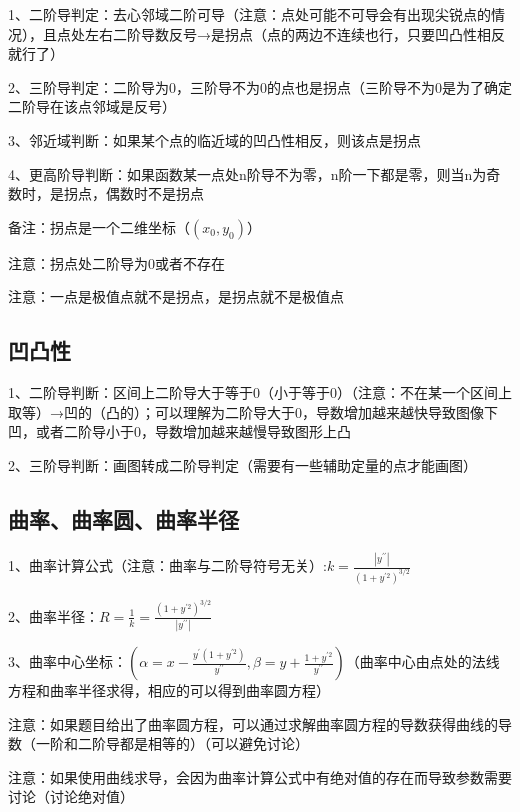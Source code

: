 1、二阶导判定：去心邻域二阶可导（注意：点处可能不可导会有出现尖锐点的情况），且点处左右二阶导数反号→是拐点（点的两边不连续也行，只要凹凸性相反就行了）

2、三阶导判定：二阶导为0，三阶导不为0的点也是拐点（三阶导不为0是为了确定二阶导在该点邻域是反号）

3、邻近域判断：如果某个点的临近域的凹凸性相反，则该点是拐点

4、更高阶导判断：如果函数某一点处n阶导不为零，n阶一下都是零，则当n为奇数时，是拐点，偶数时不是拐点

备注：拐点是一个二维坐标（$(x_0,y_0)$）

注意：拐点处二阶导为0或者不存在

注意：一点是极值点就不是拐点，是拐点就不是极值点



\subsection{凹凸性}

1、二阶导判断：区间上二阶导大于等于0（小于等于0）（注意：不在某一个区间上取等）→凹的（凸的）；可以理解为二阶导大于0，导数增加越来越快导致图像下凹，或者二阶导小于0，导数增加越来越慢导致图形上凸

2、三阶导判断：画图转成二阶导判定（需要有一些辅助定量的点才能画图）



\subsection{曲率、曲率圆、曲率半径}

1、曲率计算公式（注意：曲率与二阶导符号无关）:$k=\frac{\left|y^{\prime \prime}\right|}{\left(1+y^{\prime 2}\right)^{3 / 2}}$

2、曲率半径：$R=\frac{1}{k}=\frac{\left(1+y^{\prime 2}\right)^{3 / 2}}{\left|y^{\prime \prime}\right|}$

3、曲率中心坐标：$(\alpha=x-\frac{y^{\prime}\left(1+y^{\prime 2}\right)}{y^{\prime \prime}}, \beta=y+\frac{1+y^{\prime 2}}{y^{\prime \prime}})$（曲率中心由点处的法线方程和曲率半径求得，相应的可以得到曲率圆方程）

注意：如果题目给出了曲率圆方程，可以通过求解曲率圆方程的导数获得曲线的导数（一阶和二阶导都是相等的）（可以避免讨论）

注意：如果使用曲线求导，会因为曲率计算公式中有绝对值的存在而导致参数需要讨论（讨论绝对值）



